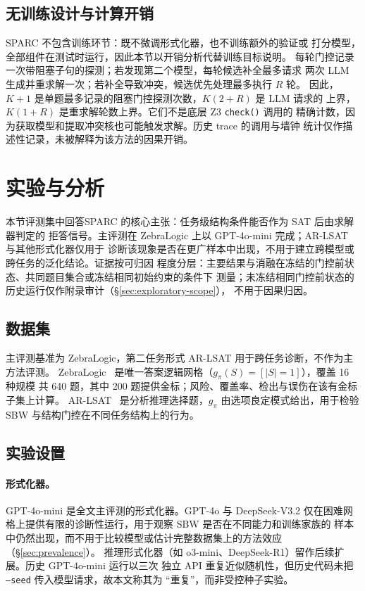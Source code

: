 \documentclass[letterpaper]{article}
\newcommand{\method}{SPARC}
\newcommand{\sbw}{SBW}
\begin{document}
\subsection{无训练设计与计算开销}
\label{sec:cost}

\method{} 不包含训练环节：既不微调形式化器，也不训练额外的验证或
打分模型，全部组件在测试时运行，因此本节以开销分析代替训练目标说明。
每轮门控记录一次带阻塞子句的探测；若发现第二个模型，每轮候选补全最多请求
两次 LLM 生成并重求解一次；若补全导致冲突，候选优先处理最多执行 $R$ 轮。
因此，$K{+}1$ 是单题最多记录的阻塞门控探测次数，$K(2{+}R)$ 是 LLM 请求的
上界，$K(1{+}R)$ 是重求解轮数上界。它们不是底层 Z3 \texttt{check()} 调用的
精确计数，因为获取模型和提取冲突核也可能触发求解。历史 trace 的调用与墙钟
统计仅作描述性记录，未被解释为该方法的因果开销。

\section{实验与分析}
\label{sec:experiments}

本节评测集中回答\method{} 的核心主张：任务级结构条件能否作为 SAT 后由求解器判定的
拒答信号。主评测在 ZebraLogic 上以 GPT-4o-mini 完成；AR-LSAT 与其他形式化器仅用于
诊断该现象是否在更广样本中出现，不用于建立跨模型或跨任务的泛化结论。证据按可归因
程度分层：主要结果与消融在冻结的门控前状态、共同题目集合或冻结相同初始约束的条件下
测量；未冻结相同门控前状态的历史运行仅作附录审计（\S\ref{sec:exploratory-scope}），
不用于因果归因。

\subsection{数据集}
主评测基准为 ZebraLogic，第二任务形式 AR-LSAT 用于跨任务诊断，不作为主方法评测。
ZebraLogic~\cite{lin2025} 是唯一答案逻辑网格（$g_{\pi}(S)=[|S|=1]$），覆盖 16 种规模
共 640 题，其中 200 题提供金标；风险、覆盖率、检出与误伤在该有金标子集上计算。
AR-LSAT~\cite{zhong2022} 是分析推理选择题，$g_{\pi}$ 由选项良定模式给出，用于检验
\sbw{} 与结构门控在不同任务结构上的行为。

\subsection{实验设置}
\label{sec:setup}

\paragraph{形式化器。}GPT-4o-mini 是全文主评测的形式化器。GPT-4o 与 DeepSeek-V3.2
仅在困难网格上提供有限的诊断性运行，用于观察 \sbw{} 是否在不同能力和训练家族的
样本中仍然出现，而不用于比较模型或估计完整数据集上的方法效应（\S\ref{sec:prevalence}）。
推理形式化器（如 o3-mini、DeepSeek-R1）留作后续扩展。历史 GPT-4o-mini 运行以三次
独立 API 重复近似随机性，但历史代码未把 \texttt{--seed} 传入模型请求，故本文称其为
“重复”，而非受控种子实验。
\end{document}
